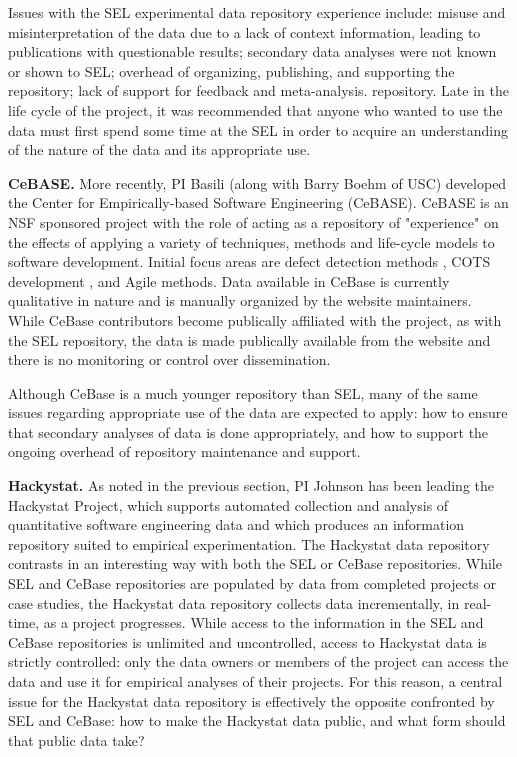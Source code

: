 Issues with the SEL experimental data repository experience include: misuse
and misinterpretation of the data due to a lack of context information,
leading to publications with questionable results; secondary data analyses
were not known or shown to SEL; overhead of organizing, publishing, and
supporting the repository; lack of support for feedback and meta-analysis.
repository.  Late in the life cycle of the project, it was recommended that
anyone who wanted to use the data must first spend some time at the SEL in
order to acquire an understanding of the nature of the data and its
appropriate use.

{\bf CeBASE.} More recently, PI Basili (along with Barry Boehm of USC)
developed the Center for Empirically-based Software Engineering
(CeBASE). CeBASE is an NSF sponsored project with the role of acting as a
repository of "experience" on the effects of applying a variety of
techniques, methods and life-cycle models to software development. Initial
focus areas are defect detection methods \cite{Boehm01}, COTS development
\cite{Basili01}, and Agile methods. Data available in CeBase is currently 
qualitative in nature and is manually organized by the website maintainers.
While CeBase contributors become publically affiliated with the project, as
with the SEL repository, the data is made publically available from the
website and there is no monitoring or control over dissemination.

Although CeBase is a much younger repository than SEL, many of the same
issues regarding appropriate use of the data are expected to apply: how 
to ensure that secondary analyses of data is done appropriately, and how to 
support the ongoing overhead of repository maintenance and support. 

{\bf Hackystat.} As noted in the previous section, PI Johnson has been
leading the Hackystat Project, which supports automated collection and
analysis of quantitative software engineering data and which produces an
information repository suited to empirical experimentation. The Hackystat
data repository contrasts in an interesting way with both the SEL or CeBase
repositories. While SEL and CeBase repositories are populated by data from
completed projects or case studies, the Hackystat data repository collects
data incrementally, in real-time, as a project progresses.  While access to
the information in the SEL and CeBase repositories is unlimited and
uncontrolled, access to Hackystat data is strictly controlled: only the
data owners or members of the project can access the data and use it for
empirical analyses of their projects. For this reason, a central issue for
the Hackystat data repository is effectively the opposite confronted by SEL
and CeBase: how to make the Hackystat data public, and what form should
that public data take?

